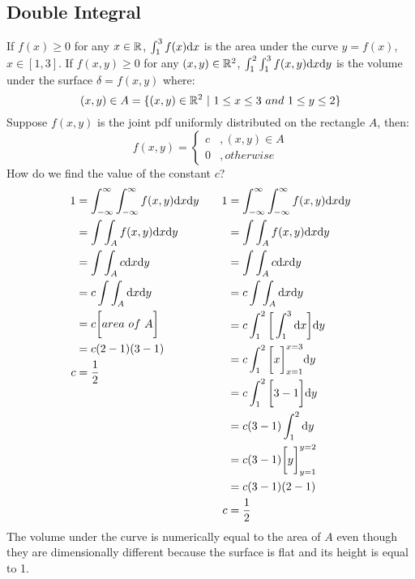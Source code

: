 \documentclass[letterpaper, 12pt]{math}
\begin{document}
\subsection*{Double Integral}
If \( f(x)\geq0 \) for any \( x\in\mathbb{R} \), \( \int_{1}^{3}f(x)\mathrm{d}{x} \) is
the area under the curve \( y = f(x) \), \( x\in[1,3] \). If \( f(x,y)\geq0 \)
for any \( (x,y)\in\mathbb{R}^{2} \), \( \int_{1}^{2}\int_{1}^{3}f(x,y)\mathrm{d}{x}\mathrm{d}{y}
\) is the volume under the surface \( \delta = f(x,y) \) where:
\[ (x,y)\in A = \{(x,y)\in\R^{2}\ |\ 1\leq x\leq 3\ and\ 1\leq y\leq 2 \} \]
Suppose \( f(x,y) \) is the joint pdf uniformly distributed on the rectangle
\( A \), then:
\[ f(x,y) = \begin{cases}
  c &, (x,y)\in A \\
  0 &, otherwise\end{cases}
\]
How do we find the value of the constant \( c \)?
\begin{equation*}
  \begin{aligned}[t]
    1 &= \int_{-\infty}^{\infty}\int_{-\infty}^{\infty}f(x,y)\mathrm{d}{x}\mathrm{d}{y} \\
    &= \int\int_{A}f(x,y)\mathrm{d}{x}\mathrm{d}{y} \\
    &= \int\int_{A}c\mathrm{d}{x}\mathrm{d}{y} \\
    &= c\int\int_{A}\mathrm{d}{x}\mathrm{d}{y} \\
    &= c\bigg[area\ of\ A\bigg] \\
    &= c(2-1)(3-1) \\
    c &= \frac{1}{2}
  \end{aligned}
  \quad\quad
  \begin{aligned}[t]
    1 &= \int_{-\infty}^{\infty}\int_{-\infty}^{\infty}f(x,y)\mathrm{d}{x}\mathrm{d}{y} \\
    &= \int\int_{A}f(x,y)\mathrm{d}{x}\mathrm{d}{y} \\
    &= \int\int_{A}c\mathrm{d}{x}\mathrm{d}{y} \\
    &= c\int\int_{A}\mathrm{d}{x}\mathrm{d}{y} \\
    &= c\int_{1}^{2}\bigg[\int_{1}^{3}\mathrm{d}{x}\bigg]\mathrm{d}{y} \\
    &= c\int_{1}^{2}\bigg[x\bigg]_{x=1}^{x=3}\mathrm{d}{y} \\
    &= c\int_{1}^{2}\bigg[3-1\bigg]\mathrm{d}{y} \\
    &= c(3-1)\int_{1}^{2}\mathrm{d}{y} \\
    &= c(3-1)\bigg[y\bigg]_{y=1}^{y=2} \\
    &= c(3-1)(2-1) \\
    c &= \frac{1}{2}
  \end{aligned}
\end{equation*}
The volume under the curve is numerically equal to the area of \( A \) even
though they are dimensionally different because the surface is flat and its
height is equal to 1.
\end{document}
